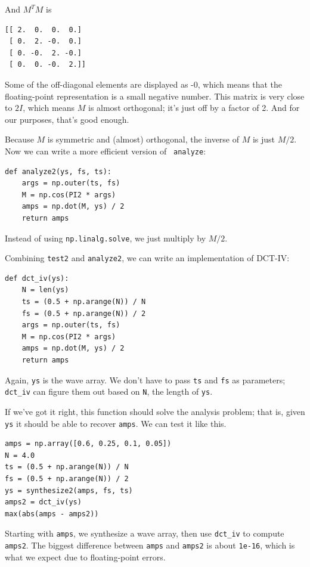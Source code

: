 \documentclass[12pt]{book}
\begin{document}
And $M^TM$ is

\begin{verbatim}
[[ 2.  0.  0.  0.]
 [ 0.  2. -0.  0.]
 [ 0. -0.  2. -0.]
 [ 0.  0. -0.  2.]]
\end{verbatim}

Some of the off-diagonal elements are displayed as -0, which means
that the floating-point representation is a small negative number.
This matrix is very close to $2I$, which means $M$ is almost
orthogonal; it's just off by a factor of 2.  And for our purposes,
that's good enough.

Because $M$ is symmetric and (almost) orthogonal, the inverse of $M$
is just $M/2$.  Now we can write a more efficient version of {\tt
  analyze}:

\begin{verbatim}
def analyze2(ys, fs, ts):
    args = np.outer(ts, fs)
    M = np.cos(PI2 * args)
    amps = np.dot(M, ys) / 2
    return amps
\end{verbatim}

Instead of using {\tt np.linalg.solve}, we just multiply
by $M/2$.

Combining {\tt test2} and {\tt analyze2}, we can write an
implementation of DCT-IV:

\begin{verbatim}
def dct_iv(ys):
    N = len(ys)
    ts = (0.5 + np.arange(N)) / N
    fs = (0.5 + np.arange(N)) / 2
    args = np.outer(ts, fs)
    M = np.cos(PI2 * args)
    amps = np.dot(M, ys) / 2
    return amps
\end{verbatim}

Again, {\tt ys} is the wave array.  We don't have to pass
{\tt ts} and {\tt fs} as parameters; \verb"dct_iv" can
figure them out based on {\tt N}, the length of {\tt ys}.

If we've got it right, this function should solve the analysis
problem; that is, given {\tt ys} it should be able to recover
{\tt amps}.  We can test it like this.

\begin{verbatim}
amps = np.array([0.6, 0.25, 0.1, 0.05])
N = 4.0
ts = (0.5 + np.arange(N)) / N
fs = (0.5 + np.arange(N)) / 2
ys = synthesize2(amps, fs, ts)
amps2 = dct_iv(ys)
max(abs(amps - amps2))
\end{verbatim}

Starting with {\tt amps}, we synthesize a wave array, then use
\verb"dct_iv" to compute {\tt amps2}.  The biggest
difference between {\tt amps} and {\tt amps2} is about {\tt 1e-16},
which is what we expect due to floating-point errors.
\end{document}
